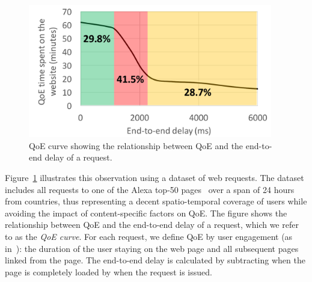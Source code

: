 \begin{figure}
	\centering
	\includegraphics[width=0.95\textwidth]{figs/qoe-curve.pdf}
	\caption{QoE curve showing the relationship between QoE and the end-to-end delay of a request.}
	\label{fig:qoe-curve}
\end{figure}
Figure~\ref{fig:qoe-curve} illustrates this observation using a dataset of \fillme web requests. The dataset includes all requests to one of the Alexa top-50 pages~\cite{??} over a span of 24 hours from \fillme countries, thus representing a decent spatio-temporal coverage of users while avoiding the impact of content-specific factors on QoE. 
The figure shows the relationship between QoE and the end-to-end delay of a request, which we refer to as the {\em QoE curve}.
For each request, we define QoE by user engagement (as in~\cite{??,??}): the duration of the user staying on the web page and all subsequent pages linked from the page. 
The end-to-end delay is calculated by subtracting when the page is completely loaded by when the request is issued. 

